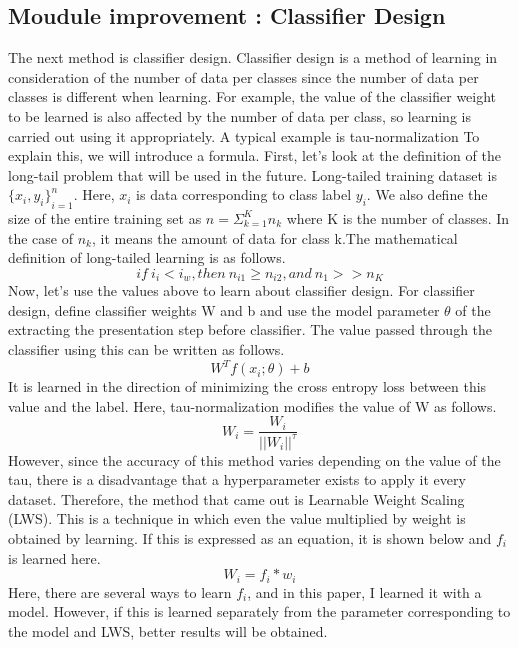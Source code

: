 \documentclass[extendedabs]{bmvc2k}
\begin{document}
  \subsection{Moudule improvement : Classifier Design}
    \quad The next method is classifier design. Classifier design is a method of learning in consideration of the number of data per classes since the number of data per classes 
    is different when learning. For example, the value of the classifier weight to be learned is also affected by the number of data per class, so learning is carried out using 
    it appropriately. A typical example is tau-normalization To explain this, we will introduce a formula. First, let's look at the definition of the long-tail problem that will 
    be used in the future.
    \newline Long-tailed training dataset is ${\{x_i,y_i\}}^n_{i=1}$. Here, $x_i$ is data corresponding to class label $y_i$. 
    We also define the size of the entire training set as $n = \Sigma^K_{k=1}n_k$ where K is the number of classes. 
    In the case of $n_k$, it means the amount of data for class k.The mathematical definition of long-tailed learning is as follows.
    $$ if\ i_i < i_w, then \ n_{i1} \geq n_{i2}, and\ n_1 >> n_K$$
    Now, let's use the values above to learn about classifier design. For classifier design, define classifier weights W and b 
    and use the model parameter $\theta$ of the extracting the presentation step before classifier. The value passed through the classifier using this can be written as follows.
    $$W^T f(x_i;\theta) + b$$
    It is learned in the direction of minimizing the cross entropy loss between this value and the label. Here, tau-normalization modifies the value of W as follows.
    $$W_i = \frac{W_i}{||W_i||^{\tau}}$$
    However, since the accuracy of this method varies depending on the value of the tau, there is a disadvantage that a hyperparameter exists to apply it every dataset. 
    Therefore, the method that came out is Learnable Weight Scaling (LWS). This is a technique in which even the value multiplied by weight is obtained by learning. 
    If this is expressed as an equation, it is shown below and $f_i$ is learned here.
    $$W_i = f_i * w_i$$
    Here, there are several ways to learn $f_i$, and in this paper, I learned it with a model. 
    However, if this is learned separately from the parameter corresponding to the model and LWS, better results will be obtained.
\end{document}
